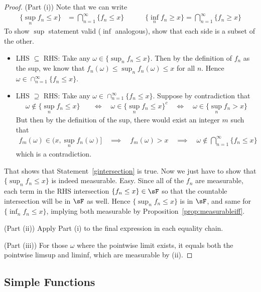 \documentclass[12pt]{article}
\theoremstyle{plain}
\theoremstyle{definition}
\theoremstyle{remark}
\newcommand{\ninf}{_{n=1}^\infty}
\begin{document}
\begin{proof}
(Part (i))
Note that we can write
\begin{align}
  \{\sup_n f_n \leq x \}
  &= \bigcap\ninf \{f_n\leq x\}
  \qquad\quad
  \{\inf_n f_n \geq x \}
  = \bigcap\ninf \{f_n\geq x\}
  \label{gintersection}
\end{align}
To show $\sup$ statement valid ($\inf$ analogous),
show that each side is a subset of the other.
\begin{itemize}
  \item LHS $\subseteq$ RHS: Take any $\omega\in\{\sup_nf_n\leq x\}$.
    Then by the definition of $f_n$ as the sup, we know that
    $f_n(\omega)\leq \sup_n f_n(\omega)\leq x$ for all $n$.
    Hence $\omega\in \cap\ninf \{f_n \leq x\}$.
  \item LHS $\supseteq$ RHS:
    Take any $\omega\in \cap\ninf \{f_n\leq x\}$. Suppose by
    contradiction that
    \begin{align*}
      \omega\not\in \{\sup_n f_n\leq x\}
      \quad&\iff\quad
      \omega\in \{\sup_n f_n\leq x\}^c
      \quad\iff\quad
      \omega\in \{\sup_n f_n > x\}
    \end{align*}
    But then by the definition of the sup, there would exist an integer
    $m$ such that
    \begin{align*}
      f_m(\omega)\in(x,\sup_n f_n(\omega)]
      \quad\implies\quad
      f_m(\omega)>x
      \quad\implies\quad
      \omega\not\in \bigcap\ninf \{f_n\leq x\}
    \end{align*}
    which is a contradiction.
\end{itemize}
That shows that Statement~\ref{gintersection} is true.
Now we just have to show that $\{\sup_n f_n\leq x\}$ is indeed
measurable. Easy.  Since all of the $f_n$ are measurable,
each term in the RHS intersection $\{f_n\leq x\}\in\sF$
so that the countable intersection will be in $\sF$ as well.
Hence $\{\sup_n f_n\leq x\}$ is in $\sF$, and same for
$\{\inf_n f_n\leq x\}$, implying both measurable by
Proposition~\ref{prop:measurableiff}.

(Part (ii)) Apply Part (i) to the final expression in each equality
chain.

(Part (iii)) For those $\omega$ where the pointwise limit exists, it
equals both the pointwise limsup and liminf, which are measurable by
(ii).
\end{proof}


\clearpage
\subsection{Simple Functions}
\end{document}
